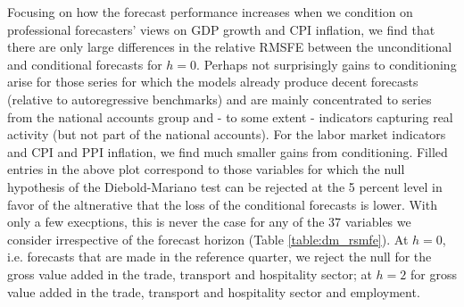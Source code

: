\documentclass[notitlepage,a4paper,12pt]{article}
\begin{document}
Focusing on how the forecast performance increases when we condition on professional forecasters' views on GDP growth and CPI inflation, we find that there are only large differences in the relative RMSFE between the unconditional and conditional forecasts for $h=0$. Perhaps not surprisingly gains to conditioning arise for those series for which the models already produce decent forecasts (relative to autoregressive benchmarks) and are mainly concentrated to series from the national accounts group and - to some extent - indicators capturing real activity (but not part of the national accounts). For the labor market indicators and CPI and PPI inflation, we find much smaller gains from conditioning. Filled entries in the above plot correspond to those variables for which the null hypothesis of the Diebold-Mariano test can be rejected at the 5 percent level in favor of the altnerative that the loss of the conditional forecasts is lower. With only a few execptions, this is never the case for any of the 37 variables we consider irrespective of the forecast horizon (Table \ref{table:dm_rsmfe}). At $h=0$, i.e. forecasts that are made in the reference quarter, we reject the null for the gross value added in the trade, transport and hospitality sector; at $h=2$ for gross value added in the trade, transport and hospitality sector and employment. 
\end{document}
